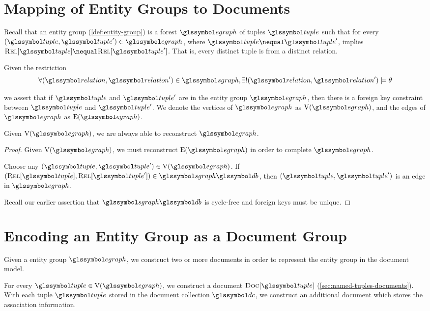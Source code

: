 	
	\section{Mapping of Entity Groups to Documents}
	\label{sec:mapping-entity-groups-to-documents}
		Recall that an entity group (\vref{def:entity-group}) is a forest \(\egraph\) of tuples \(\tuple\) such that for every \((\tuple, \tuple') \in \egraph\), where \(\tuple \nequal \tuple'\), implies \(\relations{\tuple} \nequal \relations{\tuple'}\).  That is, every distinct tuple is from a distinct relation.
		
		Given the restriction
		\[
			\forall (\relation, \relation') \in \sgraph, \exists! (\relation, \relation') \models \theta
		\]
		
		we assert that if \(\tuple\) and \(\tuple'\) are in the entity group \(\egraph\), then there is a foreign key constraint between \(\tuple\) and \(\tuple'\).  We denote the vertices of \(\egraph\) as \(\text{V}(\egraph)\), and the edges of \(\egraph\) as \(\text{E}(\egraph)\).
		
		\begin{claim}
		\label{clm:lossless}
			Given \(\text{V}(\egraph)\), we are always able to reconstruct \(\egraph\).
		\end{claim}
		
		\begin{proof}
			Given \(\text{V}(\egraph)\), we must reconstruct \(\text{E}(\egraph)\) in order to complete \(\egraph\).
			
			Choose any \((\tuple, \tuple') \in \text{V}(\egraph)\).	If \((\relations{\tuple}, \relations{\tuple'}) \in \sgraph{\db}\), then \((\tuple, \tuple')\) is an edge in \(\egraph\).
			
			Recall our earlier assertion that \(\sgraph{\db}\) is cycle-free and foreign keys must be unique.
		\end{proof}
		
	\section{Encoding an Entity Group as a Document Group}
	\label{sec:encoding-entity-group-as-document-group}
		Given a entity group \(\egraph\), we construct two or more documents in order to represent the entity group in the document model.
		
		For every \(\tuple \in \text{V}(\egraph)\), we construct a document \(\docs{\tuple}\) (\vref{sec:named-tuples-documents}).  With each tuple \(\tuple\) stored in the document collection \(\dc\), we construct an additional document which stores the association information.
		
